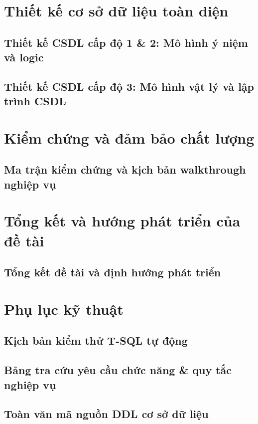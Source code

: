 \documentclass[a4paper,11pt,leqno,oneside,openany]{book}
\newcommand{\bib}{book.bib}
\begin{document}
\part{Thiết kế cơ sở dữ liệu toàn diện}\label{p:database}

\chapter{Thiết kế CSDL cấp độ 1 \& 2: Mô hình ý niệm và logic}\label{c:conceptual_logical}


\chapter{Thiết kế CSDL cấp độ 3: Mô hình vật lý và lập trình CSDL}\label{c:physical_implementation}


\part{Kiểm chứng và đảm bảo chất lượng}\label{p:validation}

\chapter{Ma trận kiểm chứng và kịch bản walkthrough nghiệp vụ}\label{c:validation_scenarios}


\part{Tổng kết và hướng phát triển của đề tài}\label{p:conclusion}

\chapter{Tổng kết đề tài và định hướng phát triển}\label{c:conclusion_future}


\appendix

\part{Phụ lục kỹ thuật}\label{p:appendix}

\chapter{Kịch bản kiểm thử T-SQL tự động}\label{a:test_scripts}


\chapter{Bảng tra cứu yêu cầu chức năng \& quy tắc nghiệp vụ}\label{a:catalog}


\chapter{Toàn văn mã nguồn DDL cơ sở dữ liệu}\label{a:sql_ddl}


\backmatter



\printindex
\end{document}
